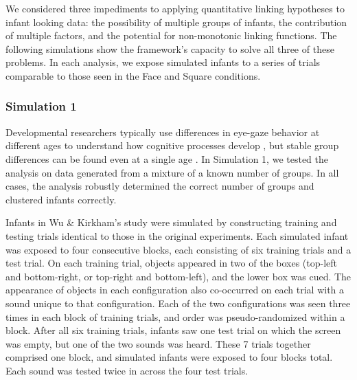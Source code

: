 \documentclass[12pt]{article}
\begin{document}
	We considered three impediments to applying quantitative linking hypotheses to infant looking data: the possibility of multiple groups of infants, the contribution of multiple factors, and the potential for non-monotonic linking functions. The following simulations show the framework’s capacity to solve all three of these problems. In each analysis, we expose simulated infants to a series of trials comparable to those seen in the Face and Square conditions. 

\subsubsection*{Simulation 1}
 
	Developmental researchers typically use differences in eye-gaze behavior at different ages to understand how cognitive processes develop \cite{Halberda2003, Kidd2011}, but stable group differences can be found even at a single age \cite{Cashon2000, Yu2011a}. In Simulation 1, we tested the analysis on data generated from a mixture of a known number of groups. In all cases, the analysis robustly determined the correct number of groups and clustered infants correctly.

	Infants in Wu \& Kirkham's \cite{Wu2010a} study were simulated by constructing training and testing trials identical to those in the original experiments. Each simulated infant was exposed to four consecutive blocks, each consisting of six training trials and a test trial. On each training trial, objects appeared in two of the boxes (top-left and bottom-right, or top-right and bottom-left), and the lower box was cued. The appearance of objects in each configuration also co-occurred on each trial with a sound unique to that configuration. Each of the two configurations was seen three times in each block of training trials, and order was pseudo-randomized within a block. After all six training trials, infants saw one test trial on which the screen was empty, but one of the two sounds was heard. These 7 trials together comprised one block, and simulated infants were exposed to four blocks total. Each sound was tested twice in across the four test trials.
\end{document}
